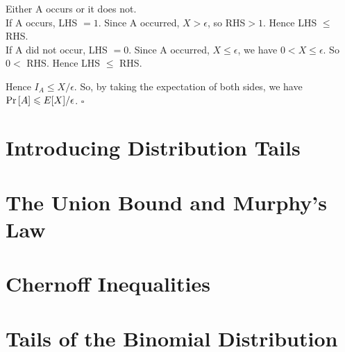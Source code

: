 Either A occurs or it does not. \\
If A occurs, LHS $=1$. Since A occurred, $X > \epsilon$, so RHS$>1$. Hence LHS $\leqslant$ RHS.\\
If A did not occur, LHS $=0$. Since A occurred, $X \leqslant \epsilon$, we have $0 < X \leqslant \epsilon$.
So $0 < $ RHS. Hence LHS $\leqslant$ RHS.

Hence $I_A \leqslant X/\epsilon$. So, by taking the expectation of both sides, 
we have  $\text{Pr}\left[A\right] \leqslant E[X]/\epsilon$. $\square$

\frmrule


\section{Introducing Distribution Tails}






\section{The Union Bound and Murphy's Law}






\section{Chernoff Inequalities}




\section{Tails of the Binomial Distribution}